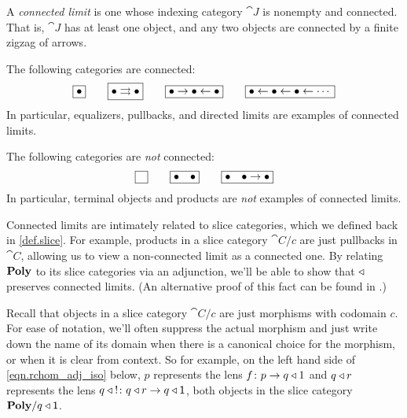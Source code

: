 \documentclass[Book-Poly]{subfiles}
\begin{document}
\begin{definition}
A \emph{connected limit} is one whose indexing category $\cat{J}$ is nonempty and connected. That is, $\cat{J}$ has at least one object, and any two objects are connected by a finite zigzag of arrows.
\end{definition}

\begin{example}
The following categories are connected:
\[
\fbox{$\bullet$}
\qquad
\fbox{$\bullet\rightrightarrows\bullet$}
\qquad
\fbox{$\bullet\to\bullet\leftarrow\bullet$}
\qquad
\fbox{$\bullet\leftarrow\bullet\leftarrow\bullet\leftarrow\cdots$}
\]
In particular, equalizers, pullbacks, and directed limits are examples of connected limits.

The following categories are \emph{not} connected:
\[
\fbox{$\phantom{\bullet}$}
\qquad
\fbox{$\bullet\quad\bullet$}
\qquad
\fbox{$\bullet\quad\bullet\to \bullet$}
\]
In particular, terminal objects and products are \emph{not} examples of connected limits.
\end{example}

Connected limits are intimately related to slice categories, which we defined back in \cref{def.slice}.
For example, products in a slice category $\cat{C}/c$ are just pullbacks in $\cat{C}$, allowing us to view a non-connected limit as a connected one.
By relating $\mathbf{Poly}$ to its slice categories via an adjunction, we'll be able to show that $\mathbin{\triangleleft}$ preserves connected limits.
(An alternative proof of this fact can be found in \cite[Proposition 1.16]{kock2012polynomial}.)

Recall that objects in a slice category $\cat{C}/c$ are just morphisms with codomain $c$.
For ease of notation, we'll often suppress the actual morphism and just write down the name of its domain when there is a canonical choice for the morphism, or when it is clear from context.
So for example, on the left hand side of \eqref{eqn.rchom_adj_iso} below, $p$ represents the lens $f\colon p\to q\mathbin{\triangleleft} 1$ and $q\mathbin{\triangleleft} r$ represents the lens $q\:\mathbin{\triangleleft}\:!\colon q\mathbin{\triangleleft} r\to q\mathbin{\triangleleft}\textsf{1}$, both objects in the slice category $\mathbf{Poly}/q\mathbin{\triangleleft}\textsf{1}$.
\end{document}
